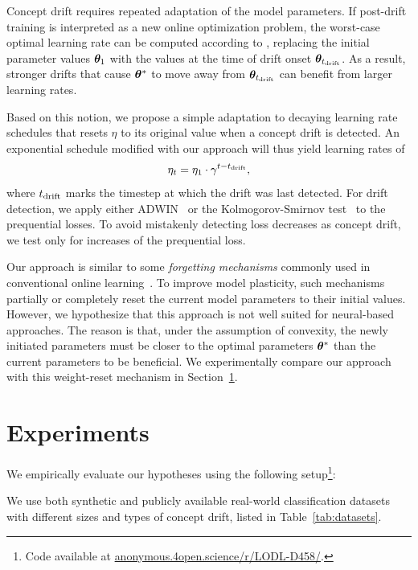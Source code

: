 \documentclass{article} %
\begin{document}
Concept drift requires repeated adaptation of the model parameters.
If post-drift training is interpreted as a new online optimization problem, the worst-case optimal learning rate can be computed according to , replacing the initial parameter values ${\bm{\theta}}_1$ with the values at the time of drift onset ${\bm{\theta}}_{t_{\rm{drift}}}$.
As a result, stronger drifts that cause ${\bm{\theta}}^*$ to move away from ${\bm{\theta}}_{t_{\rm{drift}}}$ can benefit from larger learning rates.

Based on this notion, we propose a simple adaptation to decaying learning rate schedules that resets $\eta$ to its original value when a concept drift is detected.
An exponential schedule modified with our approach will thus yield learning rates of
\begin{equation}
   \eta_t = \eta_1 \cdot \gamma^{t-t_{\rm{drift}}},
\end{equation}\label{eq:drift_reset}
where $t_{\rm{drift}}$ marks the timestep at which the drift was last detected.
For drift detection, we apply either ADWIN~\citep{bifetLearningTimeChangingData2007} or the Kolmogorov-Smirnov test~\citep{masseyKolmogorovSmirnovTestGoodness1951} to the prequential losses.
To avoid mistakenly detecting loss decreases as concept drift, we test only for increases of the prequential loss.

Our approach is similar to some \textit{forgetting mechanisms} commonly used in conventional online learning~\citep{gamaSurveyConceptDrift2014}.
To improve model plasticity, such mechanisms partially or completely reset the current model parameters to their initial values.
However, we hypothesize that this approach is not well suited for neural-based approaches.
The reason is that, under the assumption of convexity, the newly initiated parameters must be closer to the optimal parameters ${\bm{\theta}}^*$ than the current parameters to be beneficial.
We experimentally compare our approach with this weight-reset mechanism in Section~\ref{sec:experiments}.

\section{Experiments}\label{sec:experiments}

We empirically evaluate our hypotheses using the following setup\footnote[3]{Code available at \url{anonymous.4open.science/r/LODL-D458/}.}:

We use both synthetic and publicly available real-world classification datasets with different sizes and types of concept drift, listed in Table~\ref{tab:datasets}.
\end{document}
